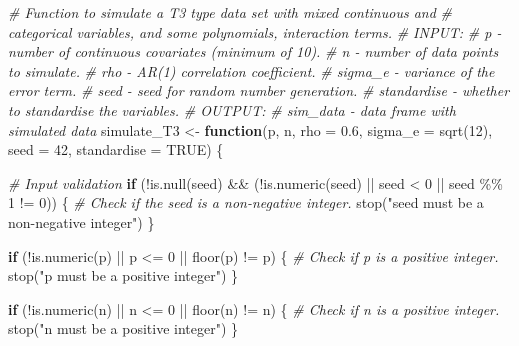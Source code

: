 \documentclass[
  11pt,
]{article}
\newenvironment{Shaded}{}{}
\newcommand{\AttributeTok}[1]{\textcolor[rgb]{0.49,0.56,0.16}{#1}}
\newcommand{\CommentTok}[1]{\textcolor[rgb]{0.38,0.63,0.69}{\textit{#1}}}
\newcommand{\ConstantTok}[1]{\textcolor[rgb]{0.53,0.00,0.00}{#1}}
\newcommand{\ControlFlowTok}[1]{\textcolor[rgb]{0.00,0.44,0.13}{\textbf{#1}}}
\newcommand{\DecValTok}[1]{\textcolor[rgb]{0.25,0.63,0.44}{#1}}
\newcommand{\FloatTok}[1]{\textcolor[rgb]{0.25,0.63,0.44}{#1}}
\newcommand{\FunctionTok}[1]{\textcolor[rgb]{0.02,0.16,0.49}{#1}}
\newcommand{\NormalTok}[1]{#1}
\newcommand{\OtherTok}[1]{\textcolor[rgb]{0.00,0.44,0.13}{#1}}
\newcommand{\SpecialCharTok}[1]{\textcolor[rgb]{0.25,0.44,0.63}{#1}}
\newcommand{\StringTok}[1]{\textcolor[rgb]{0.25,0.44,0.63}{#1}}
\begin{document}
\begin{Shaded}
\begin{Highlighting}[]
\CommentTok{\# Function to simulate a T3 type data set with mixed continuous and }
\CommentTok{\#     categorical variables, and some polynomials, interaction terms.}
\CommentTok{\# INPUT: }
\CommentTok{\#       p {-} number of continuous covariates (minimum of 10).}
\CommentTok{\#       n {-} number of data points to simulate.}
\CommentTok{\#       rho {-} AR(1) correlation coefficient.}
\CommentTok{\#       sigma\_e {-} variance of the error term.}
\CommentTok{\#       seed {-} seed for random number generation.}
\CommentTok{\#       standardise {-} whether to standardise the variables.}
\CommentTok{\# OUTPUT:}
\CommentTok{\#       sim\_data {-} data frame with simulated data}
\NormalTok{simulate\_T3 }\OtherTok{\textless{}{-}} \ControlFlowTok{function}\NormalTok{(p, n, }\AttributeTok{rho =} \FloatTok{0.6}\NormalTok{, }\AttributeTok{sigma\_e =} \FunctionTok{sqrt}\NormalTok{(}\DecValTok{12}\NormalTok{), }
                        \AttributeTok{seed =} \DecValTok{42}\NormalTok{, }\AttributeTok{standardise =} \ConstantTok{TRUE}\NormalTok{) \{}
  
  \CommentTok{\# Input validation}
  \ControlFlowTok{if}\NormalTok{ (}\SpecialCharTok{!}\FunctionTok{is.null}\NormalTok{(seed) }\SpecialCharTok{\&\&}\NormalTok{ (}\SpecialCharTok{!}\FunctionTok{is.numeric}\NormalTok{(seed) }\SpecialCharTok{||}\NormalTok{ seed }\SpecialCharTok{\textless{}} \DecValTok{0} \SpecialCharTok{||}\NormalTok{ seed }\SpecialCharTok{\%\%} \DecValTok{1} \SpecialCharTok{!=} \DecValTok{0}\NormalTok{)) \{}
    \CommentTok{\# Check if the seed is a non{-}negative integer.}
    \FunctionTok{stop}\NormalTok{(}\StringTok{"seed must be a non{-}negative integer"}\NormalTok{)}
\NormalTok{  \}}
  
  \ControlFlowTok{if}\NormalTok{ (}\SpecialCharTok{!}\FunctionTok{is.numeric}\NormalTok{(p) }\SpecialCharTok{||}\NormalTok{ p }\SpecialCharTok{\textless{}=} \DecValTok{0} \SpecialCharTok{||} \FunctionTok{floor}\NormalTok{(p) }\SpecialCharTok{!=}\NormalTok{ p) \{}
    \CommentTok{\# Check if p is a positive integer.}
    \FunctionTok{stop}\NormalTok{(}\StringTok{"p must be a positive integer"}\NormalTok{)}
\NormalTok{  \}}
  
  \ControlFlowTok{if}\NormalTok{ (}\SpecialCharTok{!}\FunctionTok{is.numeric}\NormalTok{(n) }\SpecialCharTok{||}\NormalTok{ n }\SpecialCharTok{\textless{}=} \DecValTok{0} \SpecialCharTok{||} \FunctionTok{floor}\NormalTok{(n) }\SpecialCharTok{!=}\NormalTok{ n) \{}
    \CommentTok{\# Check if n is a positive integer.}
    \FunctionTok{stop}\NormalTok{(}\StringTok{"n must be a positive integer"}\NormalTok{)}
\NormalTok{  \}}
  

\end{Highlighting}
\end{Shaded}
\end{document}
